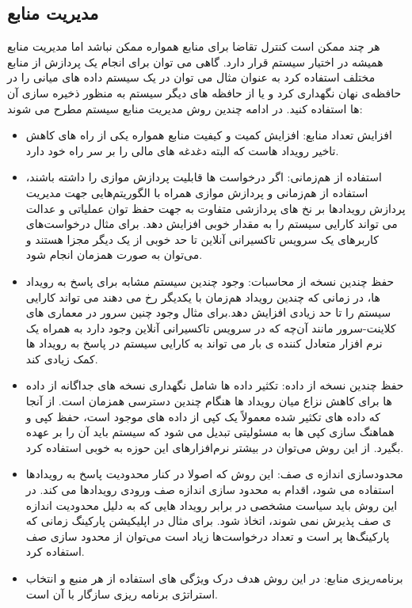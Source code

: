 \subsection{مدیریت منابع}
هر چند ممکن است کنترل تقاضا برای منابع همواره ممکن نباشد اما مدیریت منابع همیشه در اختیار سیستم قرار دارد. گاهی می توان برای انجام یک پردازش از منابع مختلف استفاده کرد به عنوان مثال می توان در یک سیستم داده های میانی را در حافظه‌ی نهان نگهداری کرد و یا از حافظه های دیگر سیستم به منظور ذخیره سازی آن ها استفاده کنید. در ادامه چندین روش مدیریت منابع سیستم مطرح می شوند:
\begin{itemize}
\item
افزایش تعداد منابع: افزایش کمیت و کیفیت منابع همواره یکی از راه های کاهش تاخیر رویداد هاست که البته دغدغه های مالی را بر سر راه خود دارد.
\item 
استفاده از هم‌زمانی: اگر درخواست ها قابلیت پردازش موازی را داشته باشند، ‌استفاده از هم‌زمانی و پردازش موازی همراه با الگوریتم‌هایی جهت مدیریت پردازش رویدادها بر نخ های پردازشی متفاوت به جهت حفظ توان عملیاتی و عدالت می تواند کارایی سیستم را به مقدار خوبی افزایش دهد. برای مثال درخواست‌های کاربرهای یک سرویس تاکسیرانی آنلاین تا حد خوبی از یک دیگر مجزا هستند و می‌توان به صورت همزمان انجام شود.
\item
حفظ چندین نسخه از محاسبات: وجود چندین سیستم مشابه برای پاسخ به رویداد ها، در زمانی که چندین رویداد هم‌زمان با یکدیگر رخ می دهند می تواند کارایی سیستم را تا حد زیادی افزایش دهد.برای مثال وجود چنین سرور در معماری های کلاینت-سرور مانند آن‌چه که در سرویس تاکسیرانی آنلاین وجود دارد به همراه یک نرم افزار متعادل کننده ی بار می تواند به کارایی سیستم در پاسخ به رویداد ها کمک زیادی کند.
\item 
حفظ چندین نسخه از داده: تکثیر داده ها شامل نگهداری نسخه های جداگانه از داده ها برای کاهش نزاع میان رویداد ها هنگام چندین دسترسی همزمان است. از آنجا که داده های تکثیر شده معمولاً یک کپی از داده های موجود است، حفظ کپی و هماهنگ سازی کپی ها به مسئولیتی تبدیل می شود که سیستم باید آن را بر عهده بگیرد. از این روش می‌توان در بیشتر نرم‌افزارهای این حوزه به خوبی استفاده کرد.
\item
محدود‌سازی اندازه ی صف: این روش که اصولا در کنار محدودیت پاسخ به رویدادها استفاده می شود،‌ اقدام به محدود سازی اندازه صف ورودی رویدادها می کند. در این روش باید سیاست مشخصی در برابر رویداد هایی که به دلیل محدودیت اندازه ی صف پذیرش نمی شوند،‌ اتخاذ شود. برای مثال در اپلیکیشن پارکینگ زمانی که پارکینگ‌ها پر است و تعداد درخواست‌ها زیاد است می‌توان از محدود سازی صف استفاده کرد.
\item
برنامه‌ریزی منابع: در این روش هدف درک ویژگی های استفاده از هر منبع و انتخاب استراتژی برنامه ریزی سازگار با آن است.
\end{itemize}
